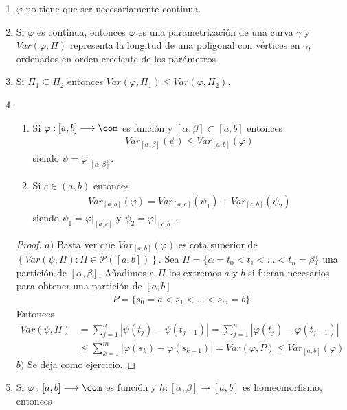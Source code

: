 \begin{obs}
\begin{enumerate}
    \item $\varphi$ no tiene que ser necesariamente continua.
    \item Si $\varphi$ es continua, entonces $\varphi$ es una parametrización de una curva $\gamma$ y $Var(\varphi,\Pi)$ representa la longitud de una poligonal con vértices en $\gamma$, ordenados en orden creciente de los parámetros.
    \item Si $\Pi_1 \subseteq \Pi_2$ entonces $Var(\varphi,\Pi_1) \leq Var(\varphi,\Pi_2)$.
    \item 
    \begin{enumerate}
        \item Si $\varphi : [a,b] \longrightarrow \com$ es función y $[\alpha,\beta] \subset [a,b]$ entonces
    \begin{align*}
        Var_{[\alpha,\beta]}(\psi) \leq Var_{[a,b]}(\varphi)
    \end{align*}
    siendo $\psi = \varphi |_{[\alpha,\beta]}$.
    \item Si $c \in (a,b)$ entonces
    \begin{align*}
        Var_{[a,b]}(\varphi) = Var_{[a,c]}(\psi_1) + Var_{[c,b]}(\psi_2)
    \end{align*}
     siendo $\psi_1 = \varphi |_{[a,c]}$ y $\psi_2 = \varphi |_{[c,b]}$.
    \end{enumerate}
    \begin{proof}
    $a)$ Basta ver que $Var_{[a,b]}(\varphi)$ es cota superior de $\left\{ Var(\psi,\Pi) : \Pi \in \mathcal{P}([a,b]) \right\}$. Sea $\Pi = \{ \alpha = t_0 < t_1 < ... < t_n = \beta\}$ una partición de $[\alpha,\beta]$. Añadimos a $\Pi$ los extremos $a$ y $b$ si fueran necesarios para obtener una partición de $[a,b]$
    \begin{align*}
        P = \{s_0 = a < s_1 < ... < s_m = b\}
    \end{align*}
    Entonces
    \begin{align*}
        Var(\psi,\Pi) &= \sum_{j=1}^{n}{|\psi(t_j) - \psi(t_{j-1})|} = \sum_{j=1}^{n}{|\varphi(t_j) - \varphi(t_{j-1})|} \\
        & \leq \sum_{k=1}^{m}{|\varphi(s_k) - \varphi(s_{k-1})|} = Var(\varphi, P) \leq Var_{[a,b]}(\varphi)
    \end{align*}
    $b)$ Se deja como ejercicio.
    \end{proof}
    \item Si $\varphi : [a,b] \longrightarrow \com$ es función y $h : [\alpha,\beta] \longrightarrow [a,b]$ es homeomorfismo, entonces

\end{enumerate}
\end{obs}
